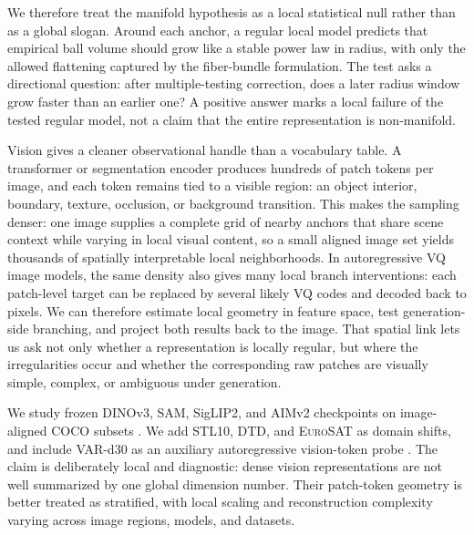 \documentclass{article}
\newcommand{\dataset}[1]{\textsc{#1}}
\begin{document}
We therefore treat the manifold hypothesis as a local statistical null rather than as a global slogan. Around each anchor, a regular local model predicts that empirical ball volume should grow like a stable power law in radius, with only the allowed flattening captured by the fiber-bundle formulation. The test asks a directional question: after multiple-testing correction, does a later radius window grow faster than an earlier one? A positive answer marks a local failure of the tested regular model, not a claim that the entire representation is non-manifold.

Vision gives a cleaner observational handle than a vocabulary table. A transformer or segmentation encoder produces hundreds of patch tokens per image, and each token remains tied to a visible region: an object interior, boundary, texture, occlusion, or background transition. This makes the sampling denser: one image supplies a complete grid of nearby anchors that share scene context while varying in local visual content, so a small aligned image set yields thousands of spatially interpretable local neighborhoods. In autoregressive VQ image models, the same density also gives many local branch interventions: each patch-level target can be replaced by several likely VQ codes and decoded back to pixels. We can therefore estimate local geometry in feature space, test generation-side branching, and project both results back to the image. That spatial link lets us ask not only whether a representation is locally regular, but where the irregularities occur and whether the corresponding raw patches are visually simple, complex, or ambiguous under generation.

We study frozen DINOv3, SAM, SigLIP2, and AIMv2 checkpoints on image-aligned \dataset{COCO} subsets \citep{simeoni2025dinov3,kirillov2023segment,tschannen2025siglip2,elnouby2024aimv2,lin2014microsoft}. We add \dataset{STL10}, \dataset{DTD}, and \dataset{EuroSAT} as domain shifts, and include VAR-d30 as an auxiliary autoregressive vision-token probe \citep{tian2024visual}. The claim is deliberately local and diagnostic: dense vision representations are not well summarized by one global dimension number. Their patch-token geometry is better treated as stratified, with local scaling and reconstruction complexity varying across image regions, models, and datasets.
\end{document}
